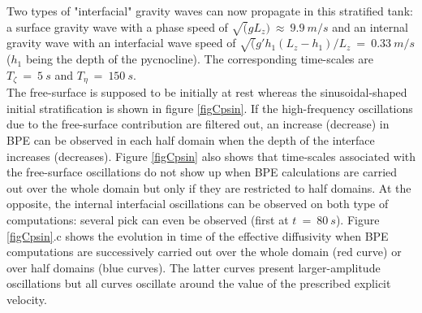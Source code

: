 Two types of "interfacial" gravity waves can now propagate in this stratified tank: a surface gravity wave with a phase speed of $\sqrt(g L_z) \ \approx \ 9.9\ m/s$ and an internal gravity wave with an interfacial wave speed of $\sqrt(g' h_1 (L_z-h_1)/L_z\ =\ 0.33\ m/s$ ($h_1$ being the depth of the pycnocline). The corresponding time-scales are $T_{\zeta} \ = \ 5 \ s$ and $T_{\eta} \ = \ 150 \ s$.\\
The free-surface is supposed to be initially at rest whereas the sinusoidal-shaped initial stratification is shown in figure \ref{figCpsin}.
If the high-frequency oscillations due to the free-surface contribution are filtered out, an increase (decrease) in BPE can be observed in each half domain when the depth of the interface increases (decreases).
Figure \ref{figCpsin} also shows that time-scales associated with the free-surface oscillations do not show up when BPE calculations are carried out over the whole domain but only if they are restricted to half domains. At the opposite, the internal interfacial oscillations can be observed on both type of computations: several pick can even be observed (first at $t\ =\ 80\ s$).
Figure \ref{figCpsin}.c shows the evolution in time of the effective diffusivity when BPE computations are successively carried out over the whole domain (red curve) or over half domains (blue curves). The latter curves present larger-amplitude oscillations but all curves oscillate around the value of the prescribed explicit velocity.

